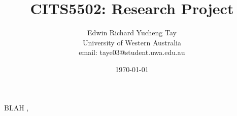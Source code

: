 \documentclass[12pt, a4paper, titlepage]{article}
\title{CITS5502: Research Project}
\author{Edwin Richard Yucheng Tay \\
University of Western Australia \\
email: taye03@student.uwa.edu.au }
\date{\today}
\begin{document}
\maketitle



\pagebreak

\tableofcontents

%
%
%
%
%
%

BLAH \cite{humphrey1999bugs}, \cite{mcdonald2007practical} \cite{doolan1992experience}
\cite{crossman1977some} \cite{cohen2006best}
\cite{siy2001does}  \cite{Boehm:2001:SDR:619059.621640}
\cite{AdvancesInSoftwareInspection} \cite{wilkerson2012comparing} \cite{kemerer2009impact} \cite{boehm2005foundations}


\appendix




\end{document}
